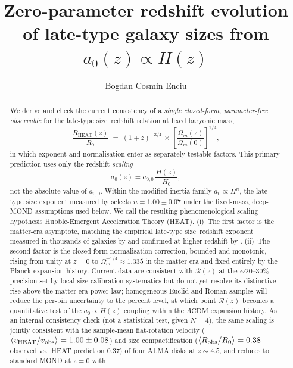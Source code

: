 \documentclass[twocolumn,letterpaper]{aastex631}
\newcommand{\azero}{a_0}
\newcommand{\lcdm}{\Lambda\mathrm{CDM}}
\newcommand{\heat}{\mathrm{HEAT}}
\newcommand{\azerolocal}{a_{0,0}}
\begin{document}
\title{Zero-parameter redshift evolution of late-type galaxy sizes
       from $\azero(z)\propto H(z)$}

\author[0009-0008-7329-7200]{Bogdan Cosmin Enciu}

\begin{abstract}
We derive and check the current consistency of a
\emph{single closed-form, parameter-free observable}
for the late-type size--redshift relation at fixed baryonic
mass,
\[
  \frac{R_{\heat}(z)}{R_{0}}
   \;=\;(1+z)^{-3/4}\,\times\,
   \left[\frac{\Omega_{m}(z)}{\Omega_{m}(0)}\right]^{1/4},
\]
in which exponent and normalisation enter as separately testable
factors.  This primary prediction uses only the redshift
\emph{scaling}
\[
  \azero(z)=\azerolocal\,\frac{H(z)}{H_{0}},
\]
not the absolute value of $\azerolocal$.  Within the
modified-inertia family $\azero\propto H^{n}$, the late-type size
exponent measured by \citet{vanderWel2014} selects
$n=1.00\pm 0.07$ under the fixed-mass, deep-MOND assumptions used
below.  We call the resulting phenomenological scaling
hypothesis Hubble-Emergent Acceleration Theory (HEAT).
(i)~The first factor is the matter-era asymptote, matching the
empirical late-type size--redshift exponent measured in
thousands of galaxies by \citet{vanderWel2014} and confirmed at
higher redshift by \citet{Allen2017}.  (ii)~The second factor
is the closed-form normalisation correction, bounded and
monotonic, rising from unity at $z=0$ to
$\Omega_{m}^{-1/4}\!\approx\!1.335$ in the matter era and fixed
entirely by the Planck expansion history.  Current data are
consistent with $\mathcal{R}(z)$ at the $\sim 20$--$30\%$
precision set by local size-calibration systematics but do not
yet resolve its distinctive rise above the matter-era power
law; homogeneous Euclid and Roman samples will reduce the
per-bin uncertainty to the percent level, at which point
$\mathcal{R}(z)$ becomes a quantitative test of the
$\azero\propto H(z)$ coupling within the $\lcdm$ expansion
history.  As an internal consistency check (not a statistical
test, given $N\!=\!4$), the same scaling is jointly consistent
with the sample-mean flat-rotation velocity
($\langle v_{\heat}/v_{\rm obs}\rangle=1.00\pm0.08$) and size
compactification ($\langle R_{\rm obs}/R_{0}\rangle=0.38$
observed vs.\ HEAT prediction $0.37$) of four ALMA disks at
$z\!\sim\!4.5$, and reduces to standard MOND at $z=0$ with

\end{abstract}
\end{document}
